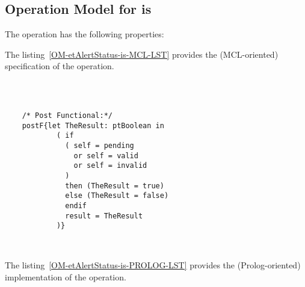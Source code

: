\subsection{Operation Model for is}

\label{OM-is}


The  operation has the following properties:

	\begin{operationmodel}



		


	\end{operationmodel}



	\vspace{1cm}
	The listing~\ref{OM-etAlertStatus-is-MCL-LST} provides the \msrmessir (MCL-oriented) specification of the operation.
	
	\scriptsize
	\vspace{0.5cm}
	\begin{lstlisting}[style=MessirStyle,firstnumber=auto,captionpos=b,caption={\msrmessir (MCL-oriented) specification of the operation \emph{is}.},label=OM-etAlertStatus-is-MCL-LST]

	
	
	/* Post Functional:*/ 
	postF{let TheResult: ptBoolean in
	        ( if
	          ( self = pending
	            or self = valid
	            or self = invalid
	          )
	          then (TheResult = true)
	          else (TheResult = false)
	          endif
	          result = TheResult
	        )}
	
	
	\end{lstlisting}
	\normalsize 
	
	
	
	
	
	\vspace{1cm}
	The listing~\ref{OM-etAlertStatus-is-PROLOG-LST} provides the \msrmessir (Prolog-oriented) implementation of the operation.
	
	\scriptsize
	\vspace{0.5cm}
	
	
	\normalsize





